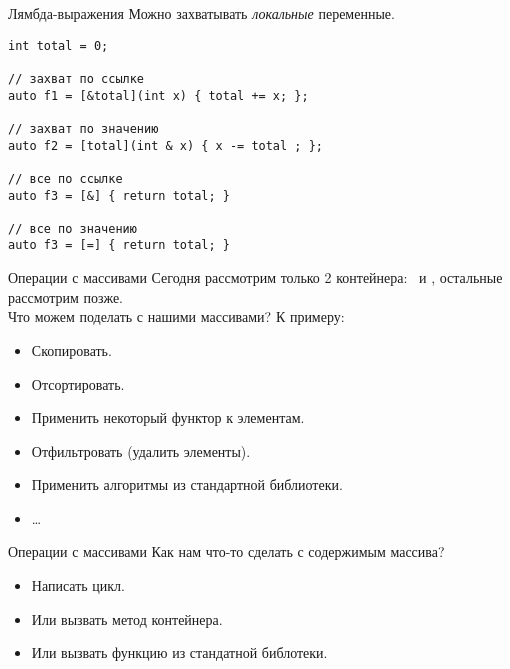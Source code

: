 \documentclass{beamer}
\begin{document}
\begin{frame}[fragile]{Лямбда-выражения}    
    Можно захватывать \emph{локальные} переменные.
    \begin{lstlisting}
int total = 0;

// захват по ссылке
auto f1 = [&total](int x) { total += x; };

// захват по значению
auto f2 = [total](int & x) { x -= total ; };

// все по ссылке
auto f3 = [&] { return total; }

// все по значению
auto f3 = [=] { return total; }
    \end{lstlisting}
\end{frame}

\begin{frame}[fragile]{Операции с массивами}
    Сегодня рассмотрим только 2 контейнера:~ и , остальные рассмотрим позже.\\
    Что можем поделать с нашими массивами? К примеру:
    \begin{itemize}
        \item Скопировать.
        \item Отсортировать.
        \item Применить некоторый функтор к элементам.
        \item Отфильтровать (удалить элементы).
        \item Применить алгоритмы из стандартной библиотеки.
        \item \dots
    \end{itemize}
\end{frame}

\begin{frame}[fragile]{Операции с массивами}
    Как нам что-то сделать с содержимым массива?
    \begin{itemize}
        \item Написать цикл.
        \item Или вызвать метод контейнера.
        \item Или вызвать функцию из стандатной библотеки.
    \end{itemize}
\end{frame}
\end{document}
